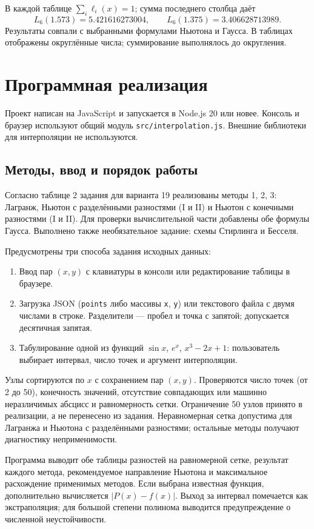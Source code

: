 \documentclass[12pt,a4paper]{article}
\begin{document}
В каждой таблице $\sum_i\ell_i(x)=1$; сумма последнего столбца даёт
\[
\boxed{L_6(1.573)=5.421616273004},\qquad
\boxed{L_6(1.375)=3.406628713989}.
\]
Результаты совпали с выбранными формулами Ньютона и Гаусса. В таблицах
отображены округлённые числа; суммирование выполнялось до округления.

\clearpage
\section{Программная реализация}
Проект написан на JavaScript и запускается в Node.js 20 или новее.
Консоль и браузер используют общий модуль \texttt{src/interpolation.js}.
Внешние библиотеки для интерполяции не используются.

\subsection{Методы, ввод и порядок работы}
Согласно таблице 2 задания для варианта 19 реализованы методы 1, 2, 3:
Лагранж, Ньютон с разделёнными разностями (I и II) и Ньютон с конечными
разностями (I и II). Для проверки вычислительной части добавлены обе
формулы Гаусса. Выполнено также необязательное задание: схемы Стирлинга и Бесселя.

Предусмотрены три способа задания исходных данных:
\begin{enumerate}[leftmargin=1.2cm]
\item Ввод пар $(x,y)$ с клавиатуры в консоли или редактирование таблицы в браузере.
\item Загрузка JSON (\texttt{points} либо массивы \texttt{x}, \texttt{y}) или
текстового файла с двумя числами в строке. Разделители --- пробел и точка с запятой;
допускается десятичная запятая.
\item Табулирование одной из функций $\sin x$, $e^x$, $x^3-2x+1$:
пользователь выбирает интервал, число точек и аргумент интерполяции.
\end{enumerate}

Узлы сортируются по $x$ с сохранением пар $(x,y)$. Проверяются число точек
(от 2 до 50), конечность значений, отсутствие совпадающих или машинно
неразличимых абсцисс и равномерность сетки. Ограничение 50 узлов принято в
реализации, а не перенесено из задания. Неравномерная сетка допустима для
Лагранжа и Ньютона с разделёнными разностями; остальные методы получают
диагностику неприменимости.

Программа выводит обе таблицы разностей на равномерной сетке,
результат каждого метода, рекомендуемое направление Ньютона и максимальное
расхождение применимых методов. Если выбрана известная функция, дополнительно
вычисляется $|P(x)-f(x)|$. Выход за интервал помечается как экстраполяция;
для большой степени полинома выводится предупреждение о численной неустойчивости.
\end{document}
